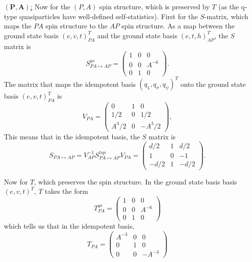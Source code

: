 \documentclass[12pt,a4paper]{article}
\newcommand{\unit}{\mathds{1}}
\newcommand\be            {\begin{equation}}
\newcommand\ee            {\end{equation}}
\begin{document}
\underline{$\mathbf{(P,A)}$:} Now for the $(P,A)$ spin structure, which is preserved by $T$ (as the q-type quasiparticles have well-defined self-statistics). First for the $S$-matrix, which maps the $PA$ spin structure to the $AP$ spin structure. As a map between the ground state basis $(e,v,t)_{PA}^T$ and the ground state basis $(e,t,h)_{AP}^T$, the $S$ matrix is
\be S^{gs}_{PA\mapsto AP} = \begin{pmatrix}
1 & 0& 0 \\ 0 & 0 & A^{-6} \\ 0&1& 0
\end{pmatrix}.\ee
The matrix that maps the idempotent basis $(q_\unit,q_\sigma,q_\psi)^T$ onto the ground state basis $(e,v,t)_{PA}^T$ is 
\be V_{PA} = \begin{pmatrix}
0 & 1 & 0 \\ 1/2 & 0 & 1/2 \\ A^3/2 & 0 & -A^3/2
\end{pmatrix},\ee
This means that in the idempotent basis, the $S$ matrix is 
\be S_{PA \mapsto AP} = V_{AP}^{-1} S^{top}_{PA \mapsto AP} V_{PA} = \begin{pmatrix}
d/2 & 1 & d/2 \\ 1 & 0 & -1 \\ -d/2 & 1 & -d/2
\end{pmatrix}.\ee

Now for $T$, which preserves the spin structure. In the ground state basis basis $(e,v,t)^T$, $T$ takes the form 
\be T^{gs}_{PA} = \begin{pmatrix}
1 & 0 & 0\\ 0 & 0 & A^{-6} \\ 0&1&0 
\end{pmatrix}\ee
which tells us that in the idempotent basis, 
\be T_{PA}  = \begin{pmatrix}
A^{-3} & 0 & 0 \\ 0 & 1 & 0 \\ 0 & 0 & -A^{-3}
\end{pmatrix}\ee
\end{document}
